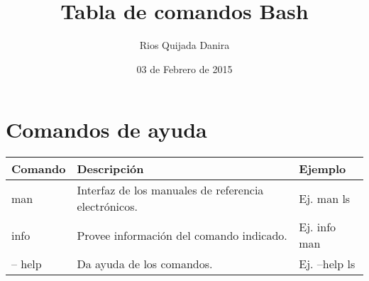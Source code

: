 \documentclass[10pt]{article}
\title{Tabla de comandos Bash}
\author{Rios Quijada Danira}
\date{03 de Febrero de 2015}
\begin{document}
\maketitle
\section{Comandos de ayuda}
\begin{tabular}{||l|l|l||}
\hline \hline
Comando & Descripción & Ejemplo \\
\hline
man & Interfaz de los manuales de referencia electrónicos. & Ej. man ls \\ \hline
info & Provee información del comando indicado. & Ej. info man \\ \hline
-- help & Da ayuda de los comandos. & Ej. --help ls \\ \hline
\end {tabular}
\end{document}
